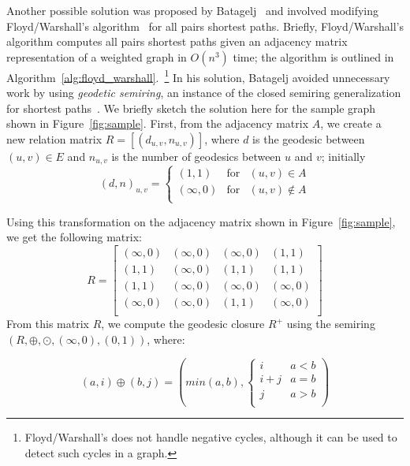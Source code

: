 Another possible solution was proposed by Batagelj~\cite{Batagelj-1994} and 
involved modifying Floyd/Warshall's algorithm~\cite{floyd62,warshall62} for 
all pairs shortest paths.
%
Briefly, Floyd/Warshall's algorithm computes all pairs shortest paths given an
adjacency matrix representation of a weighted graph in $O(n^3)$ time; the
algorithm is outlined in
Algorithm~\ref{alg:floyd_warshall}.~\footnote{Floyd/Warshall's does not handle
negative cycles, although it can be used to detect such cycles in a graph.}
%
In his solution, Batagelj avoided unnecessary work by using \textit{geodetic
semiring}, an instance of the closed semiring generalization for shortest
paths~\cite{Aho-1974}.
%
We briefly sketch the solution here for the sample graph shown in
Figure~\ref{fig:sample}.
%
First, from the adjacency matrix $A$, we create a new relation matrix
$R=[(d_{u,v}, n_{u,v})]$, where $d$ is the geodesic between $(u,v)\in{}E$ and
$n_{u,v}$ is the number of geodesics between $u$ and $v$; initially
%
\begin{equation}
(d,n)_{u,v} = \left\{ \begin{array}{rcl} 
  (1,1) & \mbox{for} & (u,v)\in{} A \\
  (\infty{},0) & \mbox{for} & (u,v)\notin{} A \\
\end{array}\right.
\label{eq:dnuv}
\end{equation}

Using this transformation on the adjacency matrix shown in
Figure~\ref{fig:sample}, we get the following matrix:
%
\begin{displaymath}
R = \left[ \begin{array}{cccc}
  (\infty{},0) & (\infty{},0) & (\infty{},0) & (1,1) \\
  (1,1) & (\infty{},0) & (1,1) & (1,1) \\
  (1,1) & (\infty{},0) & (\infty{},0) & (\infty{},0) \\
  (\infty{},0) & (\infty{},0) & (1,1) & (\infty{},0) \\
\end{array} \right]
\end{displaymath}
%
From this matrix $R$, we compute the geodesic closure $R^+$ using the semiring
$(R, \oplus{}, \odot{}, (\infty,0), (0,1))$, where:

\begin{equation}
(a,i)\oplus{}(b,j) = (min (a,b), \left\{ \begin{array}{rr} 
  i & a<b \\
  i+j & a=b \\
  j & a>b \\
\end{array}\right.)
\label{eq:oplus}
\end{equation}

